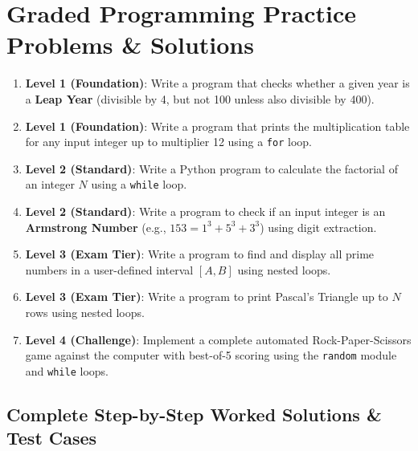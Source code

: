 \section{Graded Programming Practice Problems \& Solutions}

\begin{practiceset}
\begin{enumerate}[leftmargin=1.5em]
    \item \textbf{Level 1 (Foundation)}: Write a program that checks whether a given year is a \textbf{Leap Year} (divisible by 4, but not 100 unless also divisible by 400).
    \item \textbf{Level 1 (Foundation)}: Write a program that prints the multiplication table for any input integer up to multiplier 12 using a \texttt{for} loop.
    \item \textbf{Level 2 (Standard)}: Write a Python program to calculate the factorial of an integer $N$ using a \texttt{while} loop.
    \item \textbf{Level 2 (Standard)}: Write a program to check if an input integer is an \textbf{Armstrong Number} (e.g., $153 = 1^3 + 5^3 + 3^3$) using digit extraction.
    \item \textbf{Level 3 (Exam Tier)}: Write a program to find and display all prime numbers in a user-defined interval $[A, B]$ using nested loops.
    \item \textbf{Level 3 (Exam Tier)}: Write a program to print Pascal's Triangle up to $N$ rows using nested loops.
    \item \textbf{Level 4 (Challenge)}: Implement a complete automated Rock-Paper-Scissors game against the computer with best-of-5 scoring using the \texttt{random} module and \texttt{while} loops.
\end{enumerate}
\end{practiceset}

\subsection{Complete Step-by-Step Worked Solutions \& Test Cases}

